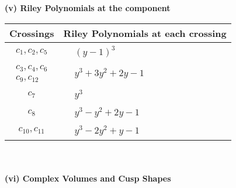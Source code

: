 \documentclass[1p]{elsarticle_modified}
\theoremstyle{definition}
\begin{document}
\newpage\renewcommand{\arraystretch}{1}
\flushleft \textbf{(v) Riley Polynomials at the component}\newline \\
\begin{tabular}{m{50pt}|m{274pt}}
Crossings & \hspace{64pt}Riley Polynomials at each crossing \\
\hline $$\begin{aligned}c_{1},c_{2},c_{5}\end{aligned}$$&$\begin{aligned}
&(y-1)^3
\end{aligned}$\\
\hline $$\begin{aligned}c_{3},c_{4},c_{6}\\c_{9},c_{12}\end{aligned}$$&$\begin{aligned}
&y^3+3 y^2+2 y-1
\end{aligned}$\\
\hline $$\begin{aligned}c_{7}\end{aligned}$$&$\begin{aligned}
&y^3
\end{aligned}$\\
\hline $$\begin{aligned}c_{8}\end{aligned}$$&$\begin{aligned}
&y^3- y^2+2 y-1
\end{aligned}$\\
\hline $$\begin{aligned}c_{10},c_{11}\end{aligned}$$&$\begin{aligned}
&y^3-2 y^2+y-1
\end{aligned}$\\
\hline
\end{tabular}\\~\\
\newpage\flushleft \textbf{(vi) Complex Volumes and Cusp Shapes}
\end{document}
